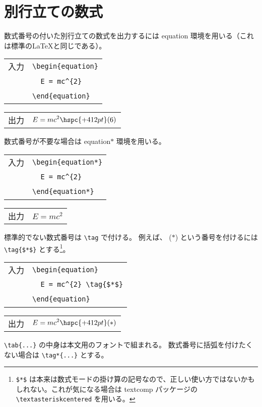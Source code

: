 \section{別行立ての数式}
数式番号の付いた別行立ての数式を出力するには equation 環境を用いる（これは標準の\LaTeX{}と同じである）。
\begin{longtable}[l]{@{}l|l@{}}
  入力 & \verb`\begin{equation}` \\
  \    & \verb`  E = mc^{2}`     \\
  \    & \verb`\end{equation}`   \\
\end{longtable}
\begin{longtable}[l]{@{}l|l@{}}
  出力 & $\displaystyle E=mc^{2} \hspc{+412pt} (\text{6})$ \\
\end{longtable}
数式番号が不要な場合は equation$*$ 環境を用いる。
\begin{longtable}[l]{@{}l|l@{}}
  入力 & \verb`\begin{equation*}` \\
  \    & \verb`  E = mc^{2}`      \\
  \    & \verb`\end{equation*}`   \\
\end{longtable}
\begin{longtable}[l]{@{}l|l@{}}
  出力 & $\displaystyle E=mc^{2}$ \\
\end{longtable}
標準的でない数式番号は \verb`\tag` で付ける。
例えば、 ($*$) という番号を付けるには \verb`\tag{$*$}` とする\footnote{\verb`$*$` は本来は数式モードの掛け算の記号なので、正しい使い方ではないかもしれない。これが気になる場合は textcomp パッケージの \verb`\textasteriskcentered` を用いる。}。
\begin{longtable}[l]{@{}l|l@{}}
  入力 & \verb`\begin{equation}`       \\
  \    & \verb`  E = mc^{2} \tag{$*$}` \\
  \    & \verb`\end{equation}`         \\
\end{longtable}
\begin{longtable}[l]{@{}l|l@{}}
  出力 & $\displaystyle E=mc^{2} \hspc{+412pt} (\text{$*$})$ \\
\end{longtable}
\verb`\tab{...}` の中身は本文用のフォントで組まれる。
数式番号に括弧を付けたくない場合は \verb`\tag*{...}` とする。\\

